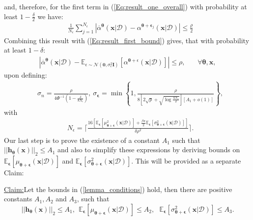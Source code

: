 \documentclass[jair,twoside,11pt,theapa]{article}
\theoremstyle{definition}
\newenvironment{claim}[1]{\par\noindent\underline{Claim:}\space#1}{}
\begin{document}
and, therefore, for the first term in (\ref{Eq:result_one_overall}) with probability at least $1 - \frac{\delta}{2}$ we have:
\begin{align*}
    &\frac{1}{N_{\epsilon}}\sum_{j=1}^{N_{\epsilon}}\left|\overline{\alpha}^{\bm{\theta}} (\bm{x}|\mathcal{D}) - \alpha^{\bm{\theta}+\bm{\epsilon}_j}(\bm{x}|\mathcal{D})\right| \le \frac{\rho}{2}
\end{align*}
Combining this result with (\ref{Eq:result_first_bound}) gives, that with probability at least $1 - \delta$:
\begin{align*}
     \left|\overline{\alpha}^{\bm{\theta}} (\bm{x}|\mathcal{D}) - \mathbb{E}_{\epsilon \sim \mathcal{N}(\bm{0}, \sigma_{\epsilon}^{2}\bm{I})}\left[\alpha^{\bm{\theta}+\epsilon}(\bm{x}|\mathcal{D})\right]\right| \le \rho, \ \ \ \ \ \ \ \ \forall\bm{\theta,x},
\end{align*}
upon defining:
\begin{align}
\label{Eq:parameter_setup}
    &\sigma_n = \frac{\rho}{4\Phi^{-1}\left(1 - \frac{\delta}{8N_{\epsilon}}\right)}, \ 
    \sigma_{\bm{\epsilon}} = \min\left\{1, \frac{\rho}{8\left[2\sqrt{p} + \sqrt{\log\frac{4N_{\epsilon}}{\delta}}\right]\left[A_1 + o(1)\right]}\right\},
\end{align}
with
\begin{align*}
    &N_{\epsilon} = \lceil\frac{16\left[\mathbb{E}_{\bm{\epsilon}}\left[\mu^2_{\bm{\theta} + \bm{\epsilon}}(\bm{x}|\mathcal{D})\right] + \frac{\beta\pi}{2}\mathbb{E}_{\bm{\epsilon}}\left[\sigma^2_{\bm{\theta} + \bm{\epsilon}}(\bm{x}|\mathcal{D})\right]\right]}{\delta\rho^2}\rceil.
\end{align*}
Our last step is to prove the existence of a constant $A_1$ such that $||\bm{h}_{\bm{\theta}}(\bm{x})||_2\le A_1$ and also to simplify these expressions by deriving bounds on  $\mathbb{E}_{\bm{\epsilon}}\left[\mu_{\bm{\theta}+\bm{\epsilon}}(\bm{x}|\mathcal{D})\right]$ and $\mathbb{E}_{\bm{\epsilon}}\left[\sigma^2_{\bm{\theta}+\bm{\epsilon}}(\bm{x}|\mathcal{D})\right]$. This will be provided as a separate Claim: \\

\begin{claim}
Let the bounds in (\ref{lemma_conditions}) hold, then there are positive constants $A_1,A_2$ and $A_3$, such that
\begin{equation}
\label{claim_results}
    ||\bm{h}_{\bm{\theta}}(\bm{x})||_2 \le A_1,\ \ 
    \mathbb{E}_{\bm{\epsilon}}\left[\mu_{\bm{\theta}+\bm{\epsilon}}(\bm{x}|\mathcal{D})\right] \le A_2, \ \ \ \mathbb{E}_{\bm{\epsilon}}\left[\sigma^2_{\bm{\theta}+\bm{\epsilon}}(\bm{x}|\mathcal{D})\right] \le A_3.
\end{equation}
\end{claim}
\end{document}
